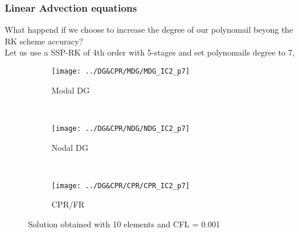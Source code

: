 \begin{frame} \frametitle{Linear Advection equations}
What happend if we choose to increase the degree of our polynomail beyong the RK scheme accuracy?\\
Let us use a SSP-RK of 4th order with 5-stages and set polynomails degree to 7,
	\begin{figure}
        \centering
        \begin{subfigure}[b]{0.31\textwidth}
                \centering
                \texttt{[image: ../DG\&CPR/MDG/MDG\_IC2\_p7]}
                \caption{Modal DG}
                \label{fig:MDG_IC2_p7}
        \end{subfigure}%
				~
        \begin{subfigure}[b]{0.31\textwidth}
                \centering
                \texttt{[image: ../DG\&CPR/NDG/NDG\_IC2\_p7]}
                \caption{Nodal DG}
                \label{fig:NDG_IC2_p7}
        \end{subfigure}
				~
        \begin{subfigure}[b]{0.31\textwidth}
								\centering
                \texttt{[image: ../DG\&CPR/CPR/CPR\_IC2\_p7]}
                \caption{CPR/FR}
                \label{fig:CPR_IC2_p7}
        \end{subfigure}
				\caption{Solution obtained with 10 elements and CFL = 0.001}
				\label{fig:compareLinearAdvection_p7}
	\end{figure}
\end{frame}

